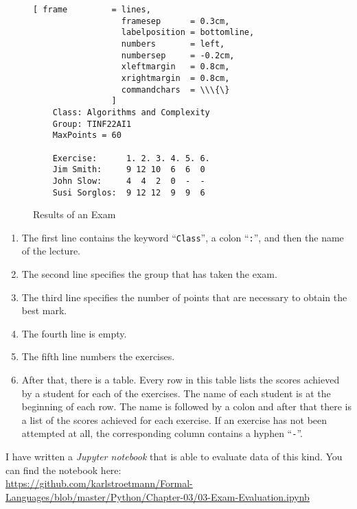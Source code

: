 \begin{figure}[!h]
\centering
\begin{Verbatim}[ frame         = lines, 
                  framesep      = 0.3cm, 
                  labelposition = bottomline,
                  numbers       = left,
                  numbersep     = -0.2cm,
                  xleftmargin   = 0.8cm,
                  xrightmargin  = 0.8cm,
                  commandchars  = \\\{\}
                ]
    Class: Algorithms and Complexity
    Group: TINF22AI1
    MaxPoints = 60
   
    Exercise:      1. 2. 3. 4. 5. 6.
    Jim Smith:     9 12 10  6  6  0
    John Slow:     4  4  2  0  -  -
    Susi Sorglos:  9 12 12  9  9  6
\end{Verbatim}
\vspace*{-0.3cm}
\caption{Results of an Exam}
\label{fig:result.txt}
\end{figure}

\begin{enumerate}
\item The first line contains the keyword ``\texttt{Class}'', a colon ``\texttt{:}'', and then the
      name of the lecture. 
\item The second line specifies the group that has taken the exam.
\item The third line specifies the number of points that are necessary to obtain the best mark.
\item The fourth line is empty.
\item The fifth line numbers the exercises.
\item After that, there is a table.  Every row in this table lists the scores achieved by a student
      for each of the exercises.  The name of each student is at the beginning of each row.  The
      name is followed by a colon and after that there is a list of the scores achieved for each
      exercise.  If an exercise has not been attempted at all, the corresponding column contains a hyphen
      ``\texttt{-}''.
\end{enumerate}
I have written a \textsl{Jupyter notebook} that is able to evaluate data of this kind.
You can find the notebook here:
\\[0.2cm]
\hspace*{-1.3cm}
\href{https://github.com/karlstroetmann/Formal-Languages/blob/master/Python/Chapter-03/03-Exam-Evaluation.ipynb}{https://github.com/karlstroetmann/Formal-Languages/blob/master/Python/Chapter-03/03-Exam-Evaluation.ipynb}

